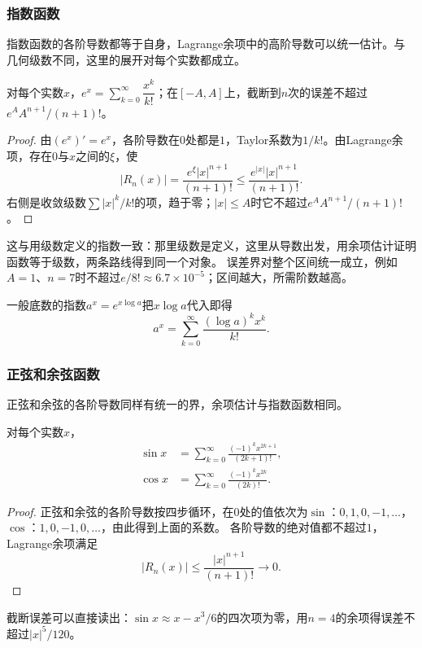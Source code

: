 \subsubsection{指数函数}
\label{sec:ru-taylor-exp}
指数函数的各阶导数都等于自身，Lagrange余项中的高阶导数可以统一估计。与几何级数不同，这里的展开对每个实数都成立。
\begin{theorem}[指数函数的展开]
\label{thm:ru-exp-series}
对每个实数$x$，$e^x=\sum_{k=0}^\infty\dfrac{x^k}{k!}$；在$[-A,A]$上，截断到$n$次的误差不超过$e^AA^{n+1}/(n+1)!$。
\end{theorem}
\begin{proof}
由$(e^x)'=e^x$，各阶导数在$0$处都是$1$，Taylor系数为$1/k!$。由Lagrange余项，存在$0$与$x$之间的$\xi$，使
\[
 |R_n(x)|=\frac{e^\xi|x|^{n+1}}{(n+1)!}\leq\frac{e^{|x|}|x|^{n+1}}{(n+1)!}.
\]
右侧是收敛级数$\sum|x|^k/k!$的项，趋于零；$|x|\leq A$时它不超过$e^AA^{n+1}/(n+1)!$。
\end{proof}
这与用级数定义的指数一致：那里级数是定义，这里从导数出发，用余项估计证明函数等于级数，两条路线得到同一个对象。
误差界对整个区间统一成立，例如$A=1$、$n=7$时不超过$e/8!\approx6.7\times10^{-5}$；区间越大，所需阶数越高。

一般底数的指数$a^x=e^{x\log a}$把$x\log a$代入即得
\[
 a^x=\sum_{k=0}^\infty\frac{(\log a)^kx^k}{k!}.
\]

\subsubsection{正弦和余弦函数}
\label{sec:ru-taylor-trig}
正弦和余弦的各阶导数同样有统一的界，余项估计与指数函数相同。
\begin{theorem}[正弦和余弦函数的展开]
\label{thm:ru-trig-series}
对每个实数$x$，
\begin{equation}
 \begin{aligned}
 \sin x&=\sum_{k=0}^\infty\frac{(-1)^kx^{2k+1}}{(2k+1)!},\\
 \cos x&=\sum_{k=0}^\infty\frac{(-1)^kx^{2k}}{(2k)!}.
 \end{aligned}
 \label{eq:ru-trig-series}
\end{equation}
\end{theorem}
\begin{proof}
正弦和余弦的各阶导数按四步循环，在$0$处的值依次为$\sin$：$0,1,0,-1,\ldots$，$\cos$：$1,0,-1,0,\ldots$，由此得到上面的系数。
各阶导数的绝对值都不超过$1$，Lagrange余项满足
\[
 |R_n(x)|\leq\frac{|x|^{n+1}}{(n+1)!}\to0.
\]
\end{proof}
截断误差可以直接读出：$\sin x\approx x-x^3/6$的四次项为零，用$n=4$的余项得误差不超过$|x|^5/120$。

